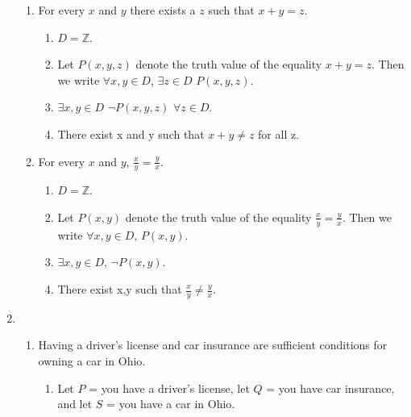 \documentclass[10pt]{article}
\theoremstyle{plain}
\theoremstyle{definition}
\begin{document}
\begin{enumerate}
\begin{enumerate}
\item For every $x$ and $y$ there exists a $z$ such that $x + y = z$. 

\begin{enumerate}

\item $D = \mathbb{Z}$. 

\item Let $P(x,y,z)$ denote the truth value of the equality $x + y = z$.  Then we write $\forall x,y \in D$, $\exists z \in D$ $P(x,y,z)$. 

\item $\exists x,y \in D$ $\neg P(x,y,z)$ $ \forall z \in D$. 

\item There exist x and y such that $x + y \neq z$ for all z. 

\end{enumerate}

\item For every $x$ and $y$, $\frac{x}{y} = \frac{y}{x}$. 

\begin{enumerate}

\item $D = \mathbb{Z}$. 

\item Let $P(x,y)$ denote the truth value of the equality $\frac{x}{y} = \frac{y}{x}$.  Then we write $\forall x,y \in D$, $P(x,y)$. 

\item $\exists x,y \in D$, $\neg P(x,y)$. 

\item There exist x,y such that $\frac{x}{y} \neq \frac{y}{x}$. 


\end{enumerate}





\end{enumerate}

\item 

\begin{enumerate}

\item Having a driver's license and car insurance are sufficient conditions for owning a car in
Ohio. 

\begin{enumerate}

\item Let $P$ = you have a driver's license, let $Q$ = you have car insurance, and let $S$ = you have a car in Ohio. 


\end{enumerate}
\end{enumerate}
\end{enumerate}
\end{document}
